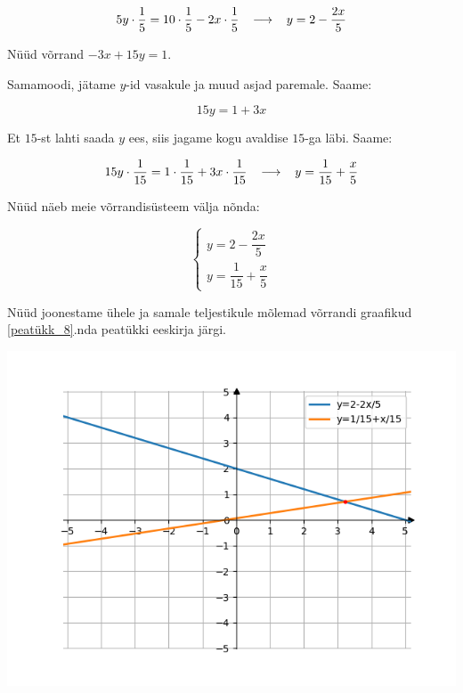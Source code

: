\begin{center}
{{{\begin{flushleft}
\[5y \cdot \dfrac{1}{5} = 10 \cdot \dfrac{1}{5}-2x \cdot \dfrac{1}{5}  \hspace{3mm} \longrightarrow \hspace{3mm} y=2-\dfrac{2x}{5} \]


\vspace{5mm}
\hspace{5mm}
Nüüd võrrand $-3x+15y=1$. 

\hspace{5mm}
Samamoodi, jätame $y$-id vasakule ja muud asjad paremale. Saame:

\[ 15y=1+3x \]

\hspace{5mm}
Et $15$-st lahti saada $y$ ees, siis jagame kogu avaldise $15$-ga läbi. Saame:

\[ 15y\cdot \dfrac{1}{15}=1\cdot \dfrac{1}{15}+3x\cdot \dfrac{1}{15} \hspace{3mm} \longrightarrow \hspace{3mm} y=\dfrac{1}{15}+\dfrac{x}{5} \] 

\hspace{5mm}
Nüüd näeb meie võrrandisüsteem välja nõnda:

\begin{equation}
\label{25_eq4}
\begin{cases}
y= 2- \dfrac{2x}{5}\\
y=\dfrac{1}{15}+\dfrac{x}{5}
\end{cases}
\end{equation}

\hspace{5mm}
Nüüd joonestame ühele ja samale teljestikule mõlemad võrrandi graafikud \ref{peatükk_8}.nda peatükki eeskirja järgi. 

\begin{center}
\includegraphics[scale=0.5]{"25_linsys_graph_joonis.png"}
\label{25_joonis1}
\end{center}

\end{flushleft}
}}}
\end{center}

